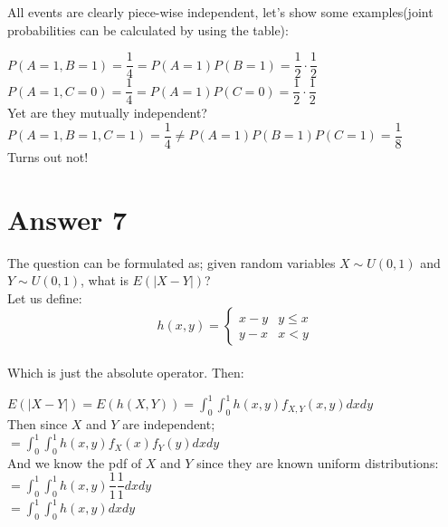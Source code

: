 \documentclass[12pt]{article}
\begin{document}
All events are clearly piece-wise independent, let's show some examples(joint probabilities can be calculated by using the table):

$P(A=1, B=1) = \dfrac{1}{4} = P(A=1)P(B=1) = \dfrac{1}{2}\cdot \dfrac{1}{2} $ \\

$P(A=1,C=0) =  \dfrac{1}{4} = P(A=1)P(C=0) = \dfrac{1}{2} \cdot \dfrac{1}{2} $ \\

Yet are they mutually independent?\\

$P(A=1,B=1,C=1) = \dfrac{1}{4} \neq P(A=1)P(B=1)P(C=1) = \dfrac{1}{8} $  \\

Turns out not!


\section*{Answer 7}

The question can be formulated as; given random variables $X \sim U(0,1)$ and $Y \sim U(0,1)$, what is $E(|X-Y|)$? \\

Let us define: \\

\[  h(x,y) = \begin{cases} 
		x-y & y \leq x \\
		y-x & x < y       
   \end{cases}
\] \\

Which is just the absolute operator. Then:

$E(|X-Y|) = E(h(X,Y)) = \displaystyle \int_0^1 \int_0^1 h(x,y) f_{X,Y}(x,y) dx dy $ \\

Then since $X$ and $Y$ are independent;\\

$ = \displaystyle \int_0^1 \int_0^1 h(x,y) f_X(x) f_Y(y) dx dy $ \\

And we know the pdf of $X$ and $Y$ since they are known uniform distributions: \\

$ = \displaystyle \int_0^1 \int_0^1 h(x,y) \dfrac{1}{1} \dfrac{1}{1} dx dy $ \\

$ = \displaystyle \int_0^1 \int_0^1 h(x,y) dx dy $ \\
\end{document}
